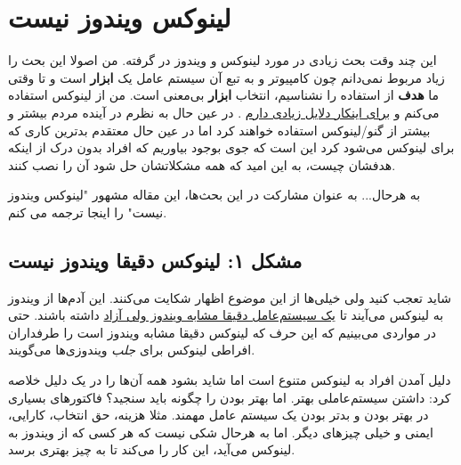 \section{لینوکس ویندوز نیست}
این چند وقت بحث زیادی در مورد لینوکس و ویندوز در گرفته. من اصولا این بحث را زیاد مربوط نمی‌دانم چون کامپیوتر و به تبع آن سیستم عامل یک
\textbf{ابزار}
است و تا وقتی ما
\textbf{هدف}
از استفاده را نشناسیم، انتخاب
\textbf{ابزار}
بی‌معنی است. من از لینوکس استفاده می‌کنم و
\href{http://www.google.com/search?client=safari&amp;rls=en-us&amp;q=site:jadi.net+لینوکس&amp;ie=UTF-8&amp;oe=UTF-8}{برای اینکار دلایل زیادی دارم}
. در عین حال به نظرم در آینده مردم بیشتر و بیشتر از گنو/لینوکس استفاده خواهند کرد اما در عین حال معتقدم بدترین کاری که برای لینوکس می‌شود کرد این است که جوی بوجود بیاوریم که افراد بدون درک از اینکه هدفشان چیست،‌ به این امید که همه مشکلاتشان حل شود آن را نصب کنند. 

به هرحال... به عنوان مشارکت در این بحث‌ها،‌ این مقاله مشهور "لینوکس ویندوز نیست"
 را اینجا ترجمه می کنم.
\begin{center}
	\begin{figure}[H]
		\centering
	\end{figure}
\end{center}
\subsection*{مشکل ۱: لینوکس دقیقا ویندوز نیست}
شاید تعجب کنید ولی خیلی‌ها از این موضوع اظهار شکایت می‌کنند. این آدم‌ها از ویندوز به لینوکس می‌آیند تا
\href{http://www.reactos.com/' }{یک سیستم‌عامل دقیقا مشابه ویندوز ولی آزاد}
داشته باشند. حتی در مواردی می‌بینیم که این حرف که لینوکس دقیقا مشابه ویندوز است را طرفداران افراطی لینوکس برای
\emph{جلب}
ویندوزی‌ها می‌گویند.

دلیل آمدن افراد به لینوکس متنوع است اما شاید بشود همه آن‌ها را در یک دلیل خلاصه کرد: داشتن سیستم‌عاملی بهتر. اما بهتر بودن را چگونه باید سنجید؟ فاکتورهای بسیاری در بهتر بودن و بدتر بودن یک سیستم عامل مهمند. مثلا هزینه، حق انتخاب، کارایی، ایمنی و خیلی چیزهای دیگر. اما به هرحال شکی نیست که هر کسی که از ویندوز به لینوکس می‌آید، این کار را می‌کند تا به چیز بهتری برسد.

